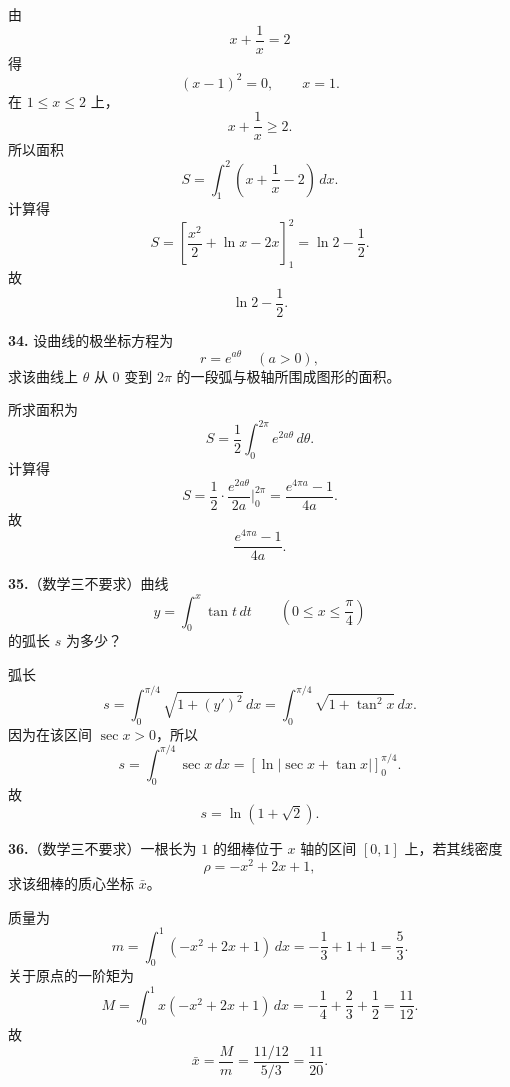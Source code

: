 \begin{solutionblock}
由
\[
x+\frac1x=2
\]
得
\[
(x-1)^2=0,\qquad x=1.
\]
在 \(1\le x\le2\) 上，
\[
x+\frac1x\ge2.
\]
所以面积
\[
S=\int_1^2\left(x+\frac1x-2\right)\,dx.
\]
计算得
\[
S=\left[\frac{x^2}{2}+\ln x-2x\right]_1^2
=\ln2-\frac12.
\]
故
\[
\boxed{\ln2-\frac12}.
\]
\end{solutionblock}

\begin{problemblock}
\textbf{34.} 设曲线的极坐标方程为
\[
r=e^{a\theta}\quad(a>0),
\]
求该曲线上 \(\theta\) 从 \(0\) 变到 \(2\pi\) 的一段弧与极轴所围成图形的面积。
\end{problemblock}

\begin{solutionblock}
所求面积为
\[
S=\frac12\int_0^{2\pi}e^{2a\theta}\,d\theta.
\]
计算得
\[
S=\frac12\cdot \frac{e^{2a\theta}}{2a}\bigg|_0^{2\pi}
=\frac{e^{4\pi a}-1}{4a}.
\]
故
\[
\boxed{\frac{e^{4\pi a}-1}{4a}}.
\]
\end{solutionblock}

\begin{problemblock}
\textbf{35.}（数学三不要求）曲线
\[
y=\int_0^x\tan t\,dt\qquad\left(0\le x\le\frac{\pi}{4}\right)
\]
的弧长 \(s\) 为多少？
\end{problemblock}

\begin{solutionblock}
弧长
\[
s=\int_0^{\pi/4}\sqrt{1+(y')^2}\,dx
=\int_0^{\pi/4}\sqrt{1+\tan^2x}\,dx.
\]
因为在该区间 \(\sec x>0\)，所以
\[
s=\int_0^{\pi/4}\sec x\,dx
=\left[\ln|\sec x+\tan x|\right]_0^{\pi/4}.
\]
故
\[
\boxed{s=\ln(1+\sqrt2)}.
\]
\end{solutionblock}

\begin{problemblock}
\textbf{36.}（数学三不要求）一根长为 \(1\) 的细棒位于 \(x\) 轴的区间 \([0,1]\) 上，若其线密度
\[
\rho=-x^2+2x+1,
\]
求该细棒的质心坐标 \(\bar x\)。
\end{problemblock}

\begin{solutionblock}
质量为
\[
m=\int_0^1(-x^2+2x+1)\,dx
=-\frac13+1+1=\frac53.
\]
关于原点的一阶矩为
\[
M=\int_0^1x(-x^2+2x+1)\,dx
=-\frac14+\frac23+\frac12
=\frac{11}{12}.
\]
故
\[
\bar x=\frac{M}{m}
=\frac{11/12}{5/3}
=\boxed{\frac{11}{20}}.
\]
\end{solutionblock}

